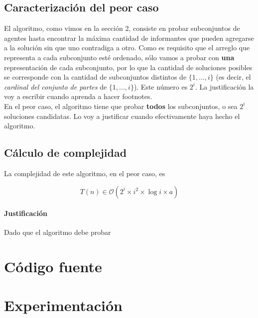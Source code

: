 \documentclass[10pt, a4paper]{article}
\begin{document}
	\subsection{Caracterizaci\'on del peor caso}
	El algoritmo, como vimos en la secci\'on 2, consiste en probar subconjuntos de agentes hasta encontrar la m\'axima cantidad de informantes que pueden agregarse a la soluci\'on sin que uno contradiga a otro. Como es requisito que el arreglo que representa a cada subconjunto est\'e ordenado, s\'olo vamos a probar con \textbf{una} representaci\'on de cada subconjunto, por lo que la cantidad de soluciones posibles se corresponde con la cantidad de subconjuntos distintos de $\{1,...,i\}$ (es decir, el \textit{cardinal del conjunto de partes} de $\{1,...,i\}$). Este n\'umero es $2^{i}$. La justificaci\'on la voy a escribir cuando aprenda a hacer footnotes.
	\\
	En el peor caso, el algoritmo tiene que probar \textbf{todos} los subconjuntos, o sea $2^{i}$ soluciones candidatas. Lo voy a justificar cuando efectivamente haya hecho el algoritmo.

	\subsection{C\'alculo de complejidad}
	La complejidad de este algoritmo, en el peor caso, es

	\begin{equation*}	
	T(n) \in \mathcal{O}(2^{i} \times i^{2} \times \log{i} \times a )
	\end{equation*}
	
	\paragraph{Justificaci\'on}
	Dado que el algoritmo debe probar 

\section{C\'odigo fuente}

\section{Experimentaci\'on}
\end{document}
